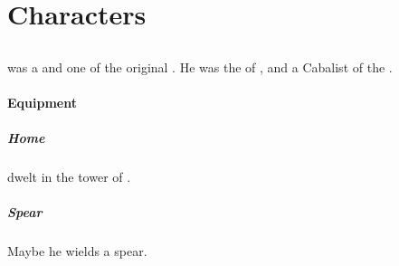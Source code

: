 
\part{\Resphan Characters}























\chapter{\CiriathSepher}















\section{\Azraid}
\index{\Azraid}
\index{\Gevural}
\Azraid was a \sathariah \resphan and one of the original . 
He was the  of , and a Cabalist of the . 









\subsection{Equipment}





\subsubsection{Home}
\Azraid dwelt in the tower of . 





\subsubsection{Spear}
Maybe he wields a spear. 

